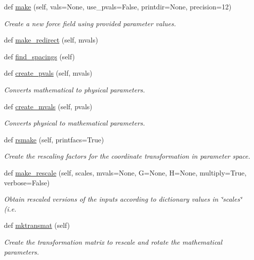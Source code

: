 \begin{DoxyCompactItemize}
def \hyperlink{classsrc_1_1ffyapf_1_1FF_a18a97385107b6be7f56315516208bb68}{make} (self, vals=None, use\+\_\+pvals=False, printdir=None, precision=12)
\begin{DoxyCompactList}\small\item\em Create a new force field using provided parameter values. \end{DoxyCompactList}\item 
def \hyperlink{classsrc_1_1ffyapf_1_1FF_a6223213f69e13dc5af90501cf4e0a877}{make\+\_\+redirect} (self, mvals)
\item 
def \hyperlink{classsrc_1_1ffyapf_1_1FF_a32548a67fd22b1016dfa37b4289000e8}{find\+\_\+spacings} (self)
\item 
def \hyperlink{classsrc_1_1ffyapf_1_1FF_a349f2f0f401834f86f9361d8ec32ad0a}{create\+\_\+pvals} (self, mvals)
\begin{DoxyCompactList}\small\item\em Converts mathematical to physical parameters. \end{DoxyCompactList}\item 
def \hyperlink{classsrc_1_1ffyapf_1_1FF_aa4b5af969fa68f6836150b934cb34a3a}{create\+\_\+mvals} (self, pvals)
\begin{DoxyCompactList}\small\item\em Converts physical to mathematical parameters. \end{DoxyCompactList}\item 
def \hyperlink{classsrc_1_1ffyapf_1_1FF_a392d73844890c87025d9a5ee2e24dc80}{rsmake} (self, printfacs=True)
\begin{DoxyCompactList}\small\item\em Create the rescaling factors for the coordinate transformation in parameter space. \end{DoxyCompactList}\item 
def \hyperlink{classsrc_1_1ffyapf_1_1FF_a36882a524f5c6a89284d3d6a97233c3f}{make\+\_\+rescale} (self, scales, mvals=None, G=None, H=None, multiply=True, verbose=False)
\begin{DoxyCompactList}\small\item\em Obtain rescaled versions of the inputs according to dictionary values in \char`\"{}scales\char`\"{} (i.\+e. \end{DoxyCompactList}\item 
def \hyperlink{classsrc_1_1ffyapf_1_1FF_ab540e44d9ab8dccb60048694e460c4fc}{mktransmat} (self)
\begin{DoxyCompactList}\small\item\em Create the transformation matrix to rescale and rotate the mathematical parameters. \end{DoxyCompactList}\item 

\end{DoxyCompactItemize}
